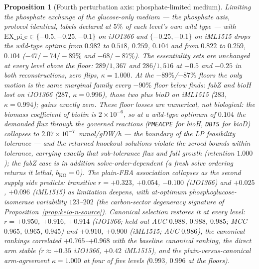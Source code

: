 \documentclass[11pt,a4paper]{article}
\theoremstyle{plain}
\newtheorem{proposition}[theorem]{Proposition}
\theoremstyle{definition}
\theoremstyle{remark}
\begin{document}
\begin{proposition}[Fourth perturbation axis: phosphate-limited medium]
\label{prop:keio-phosphate}
Limiting the phosphate exchange of the glucose-only medium ---
the phosphate axis, protocol identical, labels declared at $5\%$ of
each level's own wild type --- with
$\mathrm{EX\_pi\_e}\in\{-0.5,-0.25,-0.1\}$ on iJO1366 and
$\{-0.25,-0.1\}$ on iML1515 drops the wild-type optima from $0.982$
to $0.518$, $0.259$, $0.104$ and from $0.822$ to $0.259$, $0.104$
($-47/-74/-89\%$ and $-68/-87\%$). The essentiality sets are
unchanged at every level above the floor: $289/1{,}367$ and
$286/1{,}516$ at $-0.5$ and $-0.25$ in both reconstructions, zero
flips, $\kappa=1.000$. At the $-89\%$/$-87\%$ floors the only
motion is the same marginal family every $-90\%$ floor below finds:
\emph{fabZ} and \emph{bioH} lost on iJO1366 ($287$,
$\kappa=0.996$), those two plus \emph{bioD} on iML1515 ($283$,
$\kappa=0.994$); gains exactly zero. These floor losses are
numerical, not biological: the biomass coefficient of biotin is
$2\times10^{-6}$, so at a wild-type optimum of $0.104$ the demanded
flux through the governed reactions (\texttt{PMEACPE} for
\emph{bioH}, \texttt{DBTS} for \emph{bioD}) collapses to
$2.07\times10^{-7}$~mmol/gDW/h --- the boundary of the LP
feasibility tolerance --- and the returned knockout solutions
violate the zeroed bounds within tolerance, carrying exactly that
sub-tolerance flux and full growth (retention $1.000$); the
\emph{fabZ} case is in addition solve-order-dependent (a fresh
solve ordering returns it lethal, $b_{\mathrm{KO}}=0$). The
plain-FBA association collapses as the second supply side
predicts: transitive $r=+0.323$, $+0.054$, $-0.100$ (iJO1366) and
$+0.025$, $+0.096$ (iML1515) as limitation deepens, with
at-optimum phosphoglucose-isomerase variability $123$--$202$ (the
carbon-sector degeneracy signature of
Proposition~\ref{prop:keio-n-source}). Canonical selection
restores it at every level: $r=+0.950$, $+0.916$, $+0.914$
(iJO1366; held-out AUC $0.988$, $0.988$, $0.985$; MCC $0.965$,
$0.965$, $0.945$) and $+0.910$, $+0.900$ (iML1515; AUC $0.986$),
the canonical rankings correlated $+0.765$--$+0.968$ with the
baseline canonical ranking, the direct arm stable ($r\approx+0.35$
iJO1366, $+0.42$ iML1515), and the plain-versus-canonical
arm-agreement $\kappa=1.000$ at four of five levels ($0.993$,
$0.996$ at the floors).
\end{proposition}
\end{document}
